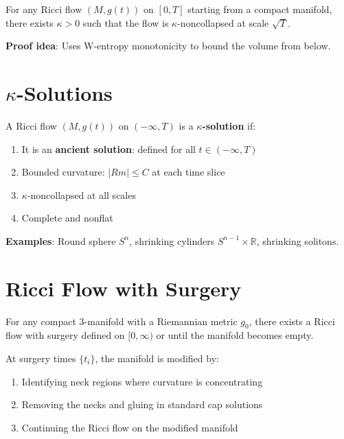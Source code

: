 \begin{theorem}
\label{thm:perelman_no_local_collapsing}
For any Ricci flow $(M, g(t))$ on $[0, T]$ starting from a compact manifold, there exists $\kappa > 0$ such that the flow is $\kappa$-noncollapsed at scale $\sqrt{T}$.

\textbf{Proof idea}: Uses W-entropy monotonicity to bound the volume from below.
\end{theorem}

\section{$\kappa$-Solutions}

\begin{definition}
\label{def:kappa_solution}
A Ricci flow $(M, g(t))$ on $(-\infty, T)$ is a \textbf{$\kappa$-solution} if:
\begin{enumerate}
\item It is an \textbf{ancient solution}: defined for all $t \in (-\infty, T)$
\item Bounded curvature: $|Rm| \leq C$ at each time slice
\item $\kappa$-noncollapsed at all scales
\item Complete and nonflat
\end{enumerate}

\textbf{Examples}: Round sphere $S^n$, shrinking cylinders $S^{n-1} \times \mathbb{R}$, shrinking solitons.
\end{definition}

\section{Ricci Flow with Surgery}

\begin{axiom}
\label{ax:ricci_flow_with_surgery}
For any compact 3-manifold with a Riemannian metric $g_0$, there exists a Ricci flow with surgery defined on $[0, \infty)$ or until the manifold becomes empty.

At surgery times $\{t_i\}$, the manifold is modified by:
\begin{enumerate}
\item Identifying neck regions where curvature is concentrating
\item Removing the necks and gluing in standard cap solutions
\item Continuing the Ricci flow on the modified manifold
\end{enumerate}
\end{axiom}

